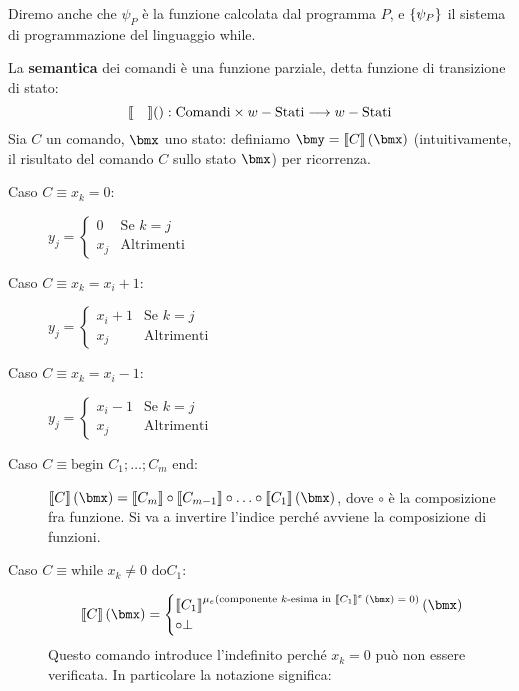 \documentclass{lectures}
\begin{document}
\begin{multicols}{2}
\begin{definition}
        Diremo anche che \(\psi_P\) è la funzione calcolata dal programma \(P\), e \(\left\{\psi_P\right\}\) il sistema di programmazione del linguaggio while.
    \end{definition}
    \begin{definition}
        La \textbf{semantica} dei comandi è una funzione parziale, detta funzione di transizione di stato:
        \[
            \llbracket\quad\rrbracket():\text{Comandi}\times w-\text{Stati}\longrightarrow w-\text{Stati}
        \]
        Sia \(C\) un comando, \(\bmx\) uno stato: definiamo \(\bmy =\ssqr{C}\rnd{\bmx}\) (intuitivamente, il risultato del comando \(C\) sullo stato \(\bmx\)) per ricorrenza.
        \begin{description}
            \item[Caso \(C\equiv x_k =0\):] \(y_j = \begin{cases}
                0 & \text{Se }k=j\\
                x_j & \text{Altrimenti}
            \end{cases}\)
            \item[Caso \(C\equiv x_k =x_i+1\):] \(y_j = \begin{cases}
                x_i+1 & \text{Se }k=j\\
                x_j & \text{Altrimenti}
            \end{cases}\)
            \item[Caso \(C\equiv x_k =x_i-1\):] \(y_j = \begin{cases}
                x_i-1 & \text{Se }k=j\\
                x_j & \text{Altrimenti}
            \end{cases}\)
            \item[Caso \(C\equiv \text{begin }C_1;\ldots;C_m\text{ end}\):] \(\ssqr{C}\rnd{\bmx} = \ssqr{C_m} \circ \ssqr{C_{m-1}} \circ \ldots \circ \ssqr{C_1}\rnd{\bmx}\), dove \(\circ\) è la composizione fra funzione. Si va a invertire l'indice perché avviene la composizione di funzioni.
            \item[Caso \(C \equiv \text{while }x_k \neq 0 \text{ do} C_1\):]\[
                \ssqr{C}\rnd{\bmx} = \begin{cases}
                    {\ssqr{C_1}}^{\mu_e \text{(componente \(k\)-esima in \({\ssqr{C_1}}^e\rnd{\bmx}=0\))}}\rnd{\bmx}\\
                    \circ \bot
                \end{cases}
            \]
            Questo comando introduce l'indefinito perché \(x_k = 0\) può non essere verificata. In particolare la notazione significa:

\end{description}
\end{definition}
\end{multicols}
\end{document}
